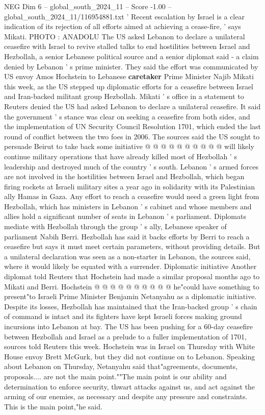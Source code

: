 \begin{textsample}{NEG Dim 6 – global\_south\_2024\_11 – Score -1.00 – global\_south\_2024\_11/116954881.txt}  \label{ex:f6_neg_109}
' Recent escalation by Israel is a clear indication of its rejection of all efforts aimed at achieving a cease-fire, ' says Mikati.
PHOTO : ANADOLU The US asked Lebanon to declare a unilateral ceasefire with Israel to revive stalled talks to end hostilities between Israel and Hezbollah, a senior Lebanese political source and a senior diplomat said - a claim denied by Lebanon ' s prime minister.
They said the effort was communicated by US envoy Amos Hochstein to Lebanese \textbf{caretaker} Prime Minister Najib Mikati this week, as the US stepped up diplomatic efforts for a ceasefire between Israel and Iran-backed militant group Hezbollah.
Mikati ' s office in a statement to Reuters denied the US had asked Lebanon to declare a unilateral ceasefire.
It said the government ' s stance was clear on seeking a ceasefire from both sides, and the implementation of UN Security Council Resolution 1701, which ended the last round of conflict between the two foes in 2006.
The sources said the US sought to persuade Beirut to take back some initiative @ @ @ @ @ @ @ @ @ @ will likely continue military operations that have already killed most of Hezbollah ' s leadership and destroyed much of the country ' s south.
Lebanon ' s armed forces are not involved in the hostilities between Israel and Hezbollah, which began firing rockets at Israeli military sites a year ago in solidarity with its Palestinian ally Hamas in Gaza.
Any effort to reach a ceasefire would need a green light from Hezbollah, which has ministers in Lebanon ' s cabinet and whose members and allies hold a significant number of seats in Lebanon ' s parliament.
Diplomats mediate with Hezbollah through the group ' s ally, Lebanese speaker of parliament Nabih Berri.
Hezbollah has said it backs efforts by Berri to reach a ceasefire but says it must meet certain parameters, without providing details.
But a unilateral declaration was seen as a non-starter in Lebanon, the sources said, where it would likely be equated with a surrender.
Diplomatic initiative Another diplomat told Reuters that Hochstein had made a similar proposal months ago to Mikati and Berri.
Hochstein @ @ @ @ @ @ @ @ @ @ he"could have something to present"to Israeli Prime Minister Benjamin Netanyahu as a diplomatic initiative.
Despite its losses, Hezbollah has maintained that the Iran-backed group ' s chain of command is intact and its fighters have kept Israeli forces making ground incursions into Lebanon at bay.
The US has been pushing for a 60-day ceasefire between Hezbollah and Israel as a prelude to a fuller implementation of 1701, sources told Reuters this week.
Hochstein was in Israel on Thursday with White House envoy Brett McGurk, but they did not continue on to Lebanon.
Speaking about Lebanon on Thursday, Netanyahu said that"agreements, documents, proposals.... are not the main point.""The main point is our ability and determination to enforce security, thwart attacks against us, and act against the arming of our enemies, as necessary and despite any pressure and constraints.
This is the main point,"he said.

\end{textsample}
